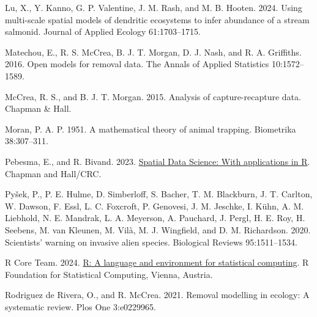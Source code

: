 \documentclass[
  11pt,
  a4paper,
]{article}
\newlength{\cslhangindent}
\newenvironment{CSLReferences}[2] %
 {\begin{list}{}{%
  \setlength{\itemindent}{0pt}
  \setlength{\leftmargin}{0pt}
  \setlength{\parsep}{0pt}
  \ifodd #1
   \setlength{\leftmargin}{\cslhangindent}
   \setlength{\itemindent}{-1\cslhangindent}
  \fi
  \setlength{\itemsep}{#2\baselineskip}}}
 {\end{list}}
\begin{document}
\begin{CSLReferences}{1}{0}
Lu, X., Y. Kanno, G. P. Valentine, J. M. Rash, and M. B. Hooten. 2024. Using multi-scale spatial models of dendritic ecosystems to infer abundance of a stream salmonid. Journal of Applied Ecology 61:1703--1715.

Matechou, E., R. S. McCrea, B. J. T. Morgan, D. J. Nash, and R. A. Griffiths. 2016. {Open models for removal data}. The Annals of Applied Statistics 10:1572--1589.

McCrea, R. S., and B. J. T. Morgan. 2015. Analysis of capture-recapture data. Chapman \& Hall.

Moran, P. A. P. 1951. A mathematical theory of animal trapping. Biometrika 38:307--311.

Pebesma, E., and R. Bivand. 2023. \href{https://doi.org/10.1201/9780429459016}{{Spatial Data Science: With applications in R}}. {Chapman and Hall/CRC}.

Pyšek, P., P. E. Hulme, D. Simberloff, S. Bacher, T. M. Blackburn, J. T. Carlton, W. Dawson, F. Essl, L. C. Foxcroft, P. Genovesi, J. M. Jeschke, I. Kühn, A. M. Liebhold, N. E. Mandrak, L. A. Meyerson, A. Pauchard, J. Pergl, H. E. Roy, H. Seebens, M. van Kleunen, M. Vilà, M. J. Wingfield, and D. M. Richardson. 2020. Scientists' warning on invasive alien species. Biological Reviews 95:1511--1534.

R Core Team. 2024. \href{https://www.R-project.org/}{R: A language and environment for statistical computing}. R Foundation for Statistical Computing, Vienna, Austria.

Rodriguez de Rivera, O., and R. McCrea. 2021. Removal modelling in ecology: A systematic review. Plos One 3:e0229965.


\end{CSLReferences}
\end{document}
